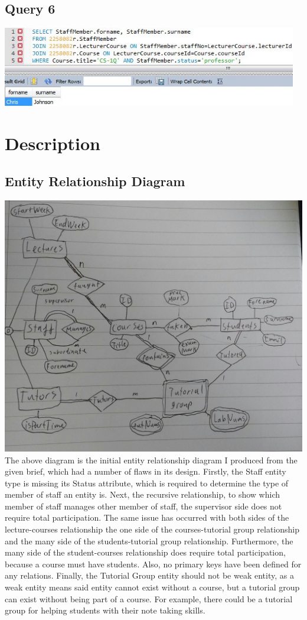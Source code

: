 \documentclass[12pt]{article}
\begin{document}
\subsection{Query 6}
\includegraphics[width=\linewidth,height=3.5cm,keepaspectratio]{query/Query6}

\section{Description}
\subsection{Entity Relationship Diagram}
\includegraphics[width=\linewidth]{ER}
The above diagram is the initial entity relationship diagram I produced from the given brief, which had a number of flaws in its design.
Firstly, the Staff entity type is missing its Status attribute, which is required to determine the type of member of staff an entity is.
Next, the recursive relationship, to show which member of staff manages other member of staff, the supervisor side does not require total participation.
The same issue has occurred with both sides of the lecture-courses relationship the one side of the courses-tutorial group relationship and the many side of the students-tutorial group relationship.
Furthermore, the many side of the student-courses relationship does require total participation, because a course must have students.
Also, no primary keys have been defined for any relations.
Finally, the Tutorial Group entity should not be weak entity, as a weak entity means said entity cannot exist without a course, but a tutorial group can exist without being part of a course.
For example, there could be a tutorial group for helping students with their note taking skills.
\end{document}
